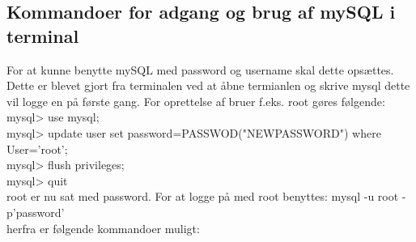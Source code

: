 \subsection{Kommandoer for adgang og brug af mySQL i terminal}
For at kunne benytte mySQL med password og username skal dette opsættes. Dette er blevet gjort fra terminalen ved at åbne termianlen og skrive mysql dette vil logge en på første gang. For oprettelse af bruer f.eks. root gøres følgende:\\
mysql> use mysql;\\
mysql> update user set password=PASSWOD("NEWPASSWORD") where User='root';\\
mysql> flush privileges;\\
mysql> quit\\

root er nu sat med password. For at logge på med root benyttes:
mysql -u root -p'password'\\
herfra er følgende kommandoer muligt:

